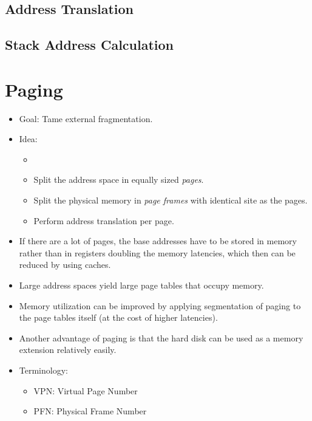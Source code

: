\documentclass[a4paper, 11pt, accentcolor = tud3b]{tudreport}
\begin{document}
            \subsection{Address Translation} %

            \subsection{Stack Address Calculation} %

        \section{Paging}
            \begin{itemize}
            	\item Goal: Tame external fragmentation.
            	\item Idea:
	            	\begin{itemize}
	            		\item 
		            	\item Split the address space in equally sized \textit{pages}.
		            	\item Split the physical memory in \textit{page frames} with identical site as the pages.
		            	\item Perform address translation per page.
		            \end{itemize}
            	\item If there are a lot of pages, the base addresses have to be stored in memory rather than in registers doubling the memory latencies, which then can be reduced by using caches.
            	\item Large address spaces yield large page tables that occupy memory.
            	\item Memory utilization can be improved by applying segmentation of paging to the page tables itself (at the cost of higher latencies).
            	\item Another advantage of paging is that the hard disk can be used as a memory extension relatively easily.
            	\item Terminology:
	            	\begin{itemize}
	            		\item VPN: Virtual Page Number
	            		\item PFN: Physical Frame Number
	            	\end{itemize}
            \end{itemize}
\end{document}
